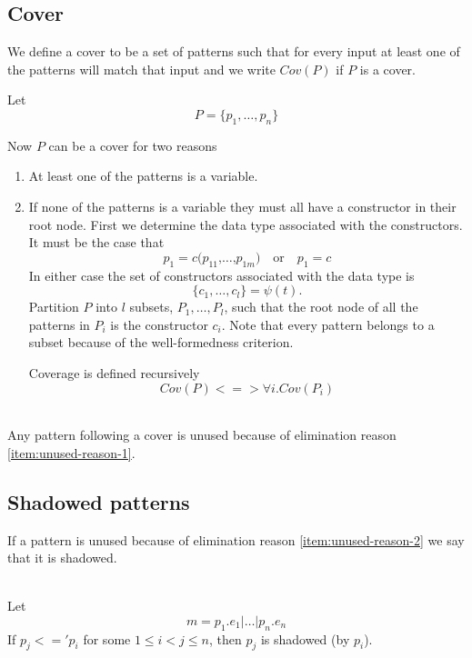 \subsection{Cover}
\label{sec:cover}
We define a cover to be a set of patterns such that for every input at least one
of the patterns will match that input and we write $Cov(P)$ if $P$ is a cover.

Let
\[
P = \{p_1,\ldots,p_n\}
\]

Now $P$ can be a cover for two reasons

\begin{enumerate}
\item At least one of the patterns is a variable.
\item If none of the patterns is a variable they must all have a constructor in
  their root node. First we determine the data type associated with the
  constructors. It must be the case that
  \[
  p_1 = c \texttt{(} p_{11} \texttt{,} \ldots \texttt{,} p_{1m}\texttt{)}
  \quad \textrm{or} \quad
  p_1 = c
  \]
  In either case the set of constructors associated with the data type is
  \[
  \{c_1, \ldots, c_l\} = \psi(t).
  \]
  Partition $P$ into $l$ subsets, $P_1, \ldots, P_l$, such that the root node of
  all the patterns in $P_i$ is the constructor $c_i$. Note that every pattern
  belongs to a subset because of the well-formedness criterion.

  Coverage is defined recursively
  \[
  Cov(P) <=> \forall i. Cov(P_i)
  \]
\end{enumerate}

\begin{lemma}\ \\
  Any pattern following a cover is unused because of elimination reason
  \ref{item:unused-reason-1}.
\end{lemma}

\subsection{Shadowed patterns}
\label{sec:shadowed-patterns}
If a pattern is unused because of elimination reason \ref{item:unused-reason-2} we say that
it is shadowed.
\begin{definition}[Shadowed]\ \\
  Let
  \[
  m = p_1\texttt{.}e_1 \texttt{|} \ldots \texttt{|} p_n\texttt{.}e_n
  \]
  If $p_j <=' p_i$ for some $1 \leq i < j \leq n$, then $p_j$ is shadowed (by
  $p_i$).
\end{definition}


